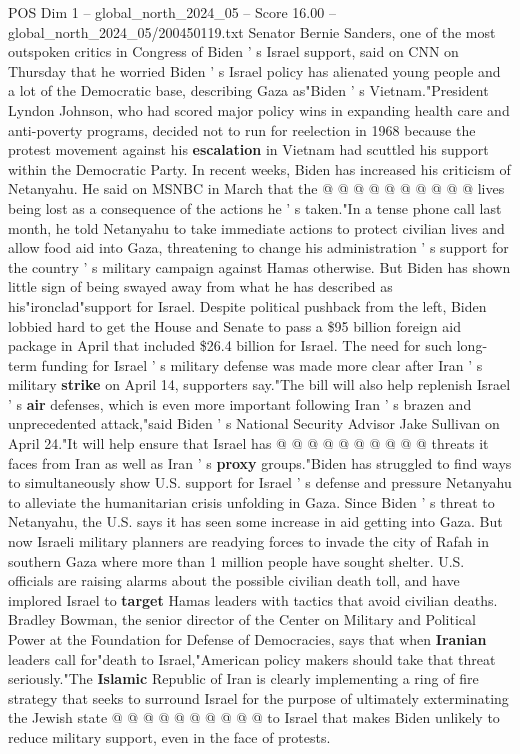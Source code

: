\begin{textsample}{POS Dim 1 – global\_north\_2024\_05 – Score 16.00 – global\_north\_2024\_05/200450119.txt}
Senator Bernie Sanders, one of the most outspoken critics in Congress of Biden ' s Israel support, said on CNN on Thursday that he worried Biden ' s Israel policy has alienated young people and a lot of the Democratic base, describing Gaza as"Biden ' s Vietnam."President Lyndon Johnson, who had scored major policy wins in expanding health care and anti-poverty programs, decided not to run for reelection in 1968 because the protest movement against his \textbf{escalation} in Vietnam had scuttled his support within the Democratic Party.
In recent weeks, Biden has increased his criticism of Netanyahu.
He said on MSNBC in March that the @ @ @ @ @ @ @ @ @ @ lives being lost as a consequence of the actions he ' s taken."In a tense phone call last month, he told Netanyahu to take immediate actions to protect civilian lives and allow food aid into Gaza, threatening to change his administration ' s support for the country ' s military campaign against Hamas otherwise.
But Biden has shown little sign of being swayed away from what he has described as his"ironclad"support for Israel.
Despite political pushback from the left, Biden lobbied hard to get the House and Senate to pass a \$95 billion foreign aid package in April that included \$26.4 billion for Israel.
The need for such long-term funding for Israel ' s military defense was made more clear after Iran ' s military \textbf{strike} on April 14, supporters say."The bill will also help replenish Israel ' s \textbf{air} defenses, which is even more important following Iran ' s brazen and unprecedented attack,"said Biden ' s National Security Advisor Jake Sullivan on April 24."It will help ensure that Israel has @ @ @ @ @ @ @ @ @ @ threats it faces from Iran as well as Iran ' s \textbf{proxy} groups."Biden has struggled to find ways to simultaneously show U.S. support for Israel ' s defense and pressure Netanyahu to alleviate the humanitarian crisis unfolding in Gaza.
Since Biden ' s threat to Netanyahu, the U.S. says it has seen some increase in aid getting into Gaza.
But now Israeli military planners are readying forces to invade the city of Rafah in southern Gaza where more than 1 million people have sought shelter.
U.S. officials are raising alarms about the possible civilian death toll, and have implored Israel to \textbf{target} Hamas leaders with tactics that avoid civilian deaths.
Bradley Bowman, the senior director of the Center on Military and Political Power at the Foundation for Defense of Democracies, says that when \textbf{Iranian} leaders call for"death to Israel,"American policy makers should take that threat seriously."The \textbf{Islamic} Republic of Iran is clearly implementing a ring of fire strategy that seeks to surround Israel for the purpose of ultimately exterminating the Jewish state @ @ @ @ @ @ @ @ @ @ to Israel that makes Biden unlikely to reduce military support, even in the face of protests.

\end{textsample}

